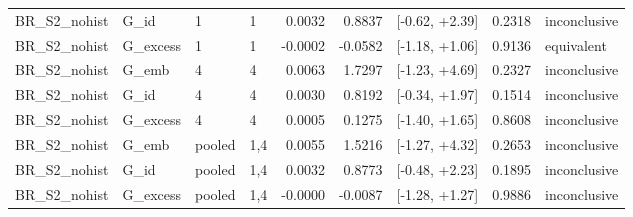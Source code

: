 \begin{tabular}{llllrrlrl}
BR\_S2\_nohist & G\_id & 1 & 1 & 0.0032 & 0.8837 & [-0.62, +2.39] & 0.2318 & inconclusive \\
BR\_S2\_nohist & G\_excess & 1 & 1 & -0.0002 & -0.0582 & [-1.18, +1.06] & 0.9136 & equivalent \\
BR\_S2\_nohist & G\_emb & 4 & 4 & 0.0063 & 1.7297 & [-1.23, +4.69] & 0.2327 & inconclusive \\
BR\_S2\_nohist & G\_id & 4 & 4 & 0.0030 & 0.8192 & [-0.34, +1.97] & 0.1514 & inconclusive \\
BR\_S2\_nohist & G\_excess & 4 & 4 & 0.0005 & 0.1275 & [-1.40, +1.65] & 0.8608 & inconclusive \\
BR\_S2\_nohist & G\_emb & pooled & 1,4 & 0.0055 & 1.5216 & [-1.27, +4.32] & 0.2653 & inconclusive \\
BR\_S2\_nohist & G\_id & pooled & 1,4 & 0.0032 & 0.8773 & [-0.48, +2.23] & 0.1895 & inconclusive \\
BR\_S2\_nohist & G\_excess & pooled & 1,4 & -0.0000 & -0.0087 & [-1.28, +1.27] & 0.9886 & inconclusive \\
\bottomrule
\end{tabular}
